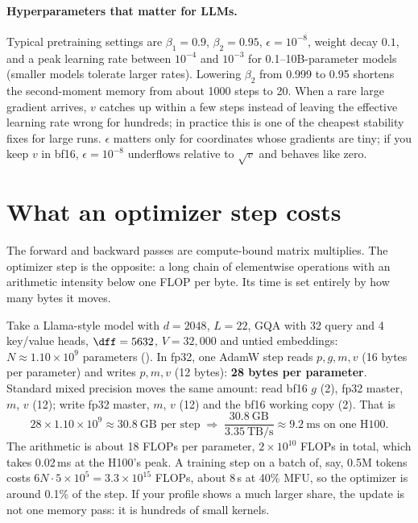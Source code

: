 \paragraph{Hyperparameters that matter for LLMs.} Typical pretraining settings are
$\beta_1=0.9$, $\beta_2=0.95$, $\epsilon=10^{-8}$, weight decay $0.1$, and a peak learning rate
between $10^{-4}$ and $10^{-3}$ for 0.1--10B-parameter models (smaller models tolerate larger
rates). Lowering $\beta_2$ from 0.999 to 0.95 shortens the second-moment memory from about 1000
steps to 20. When a rare large gradient arrives, $v$ catches up within a few steps instead of
leaving the effective learning rate wrong for hundreds; in practice this is one of the cheapest
stability fixes for large runs. $\epsilon$ matters only for coordinates whose gradients are
tiny; if you keep $v$ in bf16, $\epsilon=10^{-8}$ underflows relative to $\sqrt{v}$ and
behaves like zero.

\section{What an optimizer step costs}\label{sec:optim:cost}

The forward and backward passes are compute-bound matrix multiplies. The optimizer step is the
opposite: a long chain of elementwise operations with an arithmetic intensity below one FLOP per
byte. Its time is set entirely by how many bytes it moves.

\begin{napkinmath}
Take a Llama-style model with $d=2048$, $L=22$, GQA with 32 query and 4 key/value heads,
$\dff=5632$, $V=32{,}000$ and untied embeddings: $N\approx1.10\times10^9$ parameters
(). In fp32, one AdamW step reads $p, g, m, v$ (16 bytes per
parameter) and writes $p, m, v$ (12 bytes): \textbf{28 bytes per parameter}. Standard mixed
precision moves the same amount: read bf16 $g$ (2), fp32 master, $m$, $v$ (12); write fp32 master,
$m$, $v$ (12) and the bf16 working copy (2). That is
\[
28 \times 1.10\times10^{9} \approx 30.8\ \text{GB per step}
\;\Rightarrow\; \frac{30.8\ \text{GB}}{3.35\ \text{TB/s}} \approx 9.2\ \text{ms on one H100}.
\]
The arithmetic is about 18 FLOPs per parameter, $2\times10^{10}$ FLOPs in total, which takes 0.02\,ms
at the H100's peak. A training step on a batch of, say, 0.5M tokens costs
$6N\cdot 5\times10^5 = 3.3\times10^{15}$ FLOPs, about 8\,s at 40\% MFU, so the optimizer is
around 0.1\% of the step. If your profile shows a much larger share, the update is not one
memory pass: it is hundreds of small kernels.
\end{napkinmath}

